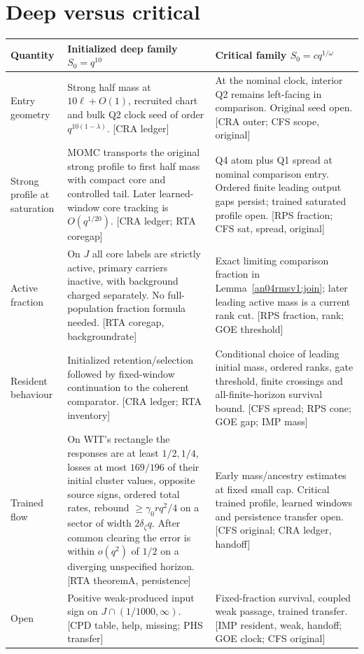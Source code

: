 \documentclass[11pt]{article}
\newcommand{\src}[1]{\textnormal{\small[#1]}}
\begin{document}
\section{Deep versus critical}\label{an04rmsv1:comparison}
\small
\begin{longtable}{@{}>{\raggedright\arraybackslash}p{}>{\raggedright\arraybackslash}p{}>{\raggedright\arraybackslash}p{}@{}}
\toprule Quantity & Initialized deep family \(S_0=q^{10}\) & Critical family \(S_0=cq^{1/\omega}\)\\\midrule\endhead
Entry geometry & Strong half mass at \(10\ell+O(1)\), recruited chart and bulk Q2 clock seed of order \(q^{10(1-\lambda)}\). \src{CRA ledger}
& At the nominal clock, interior Q2 remains left-facing in comparison. Original seed open. \src{CRA outer; CFS scope, original}\\
Strong profile at saturation & MOMC transports the original strong profile to first half mass with compact core and controlled tail. Later learned-window core tracking is \(O(q^{1/20})\). \src{CRA ledger; RTA coregap}
& Q4 atom plus Q1 spread at nominal comparison entry. Ordered finite leading output gaps persist; trained saturated profile open. \src{RPS fraction; CFS sat, spread, original}\\
Active fraction & On \(J\) all core labels are strictly active, primary carriers inactive, with background charged separately. No full-population fraction formula needed. \src{RTA coregap, backgroundrate}
& Exact limiting comparison fraction in Lemma~\ref{an04rmsv1:join}; later leading active mass is a current rank cut. \src{RPS fraction, rank; GOE threshold}\\
Resident behaviour & Initialized retention/selection followed by fixed-window continuation to the coherent comparator. \src{CRA ledger; RTA inventory}
& Conditional choice of leading initial mass, ordered ranks, gate threshold, finite crossings and all-finite-horizon survival bound. \src{CFS spread; RPS cone; GOE gap; IMP mass}\\
Trained flow & On WIT's rectangle the responses are at least \(1/2,1/4\), losses at most \(169/196\) of their initial cluster values, opposite source signs, ordered total rates, rebound \(\ge\gamma_0rq^2/4\) on a sector of width \(2\delta_\zeta q\). After common clearing the error is within \(o(q^2)\) of \(1/2\) on a diverging unspecified horizon. \src{RTA theoremA, persistence}
& Early mass/ancestry estimates at fixed small cap. Critical trained profile, learned windows and persistence transfer open. \src{CFS original; CRA ledger, handoff}\\
Open & Positive weak-produced input sign on \(J\cap(1/1000,\infty)\). \src{CPD table, help, missing; PHS transfer}
& Fixed-fraction survival, coupled weak passage, trained transfer. \src{IMP resident, weak, handoff; GOE clock; CFS original}\\
\bottomrule
\end{longtable}\normalsize
\end{document}
